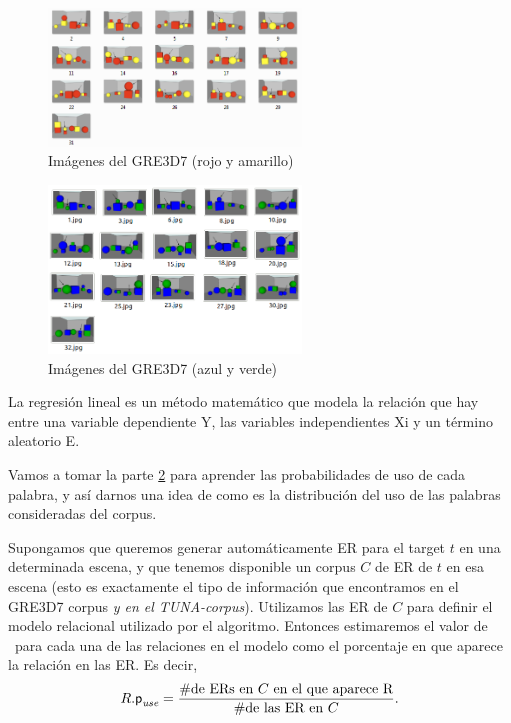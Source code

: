 \begin{figure}[ht]
\centering
\includegraphics[width=0.6\textwidth]{images/rojo-amarillo.png}
\caption{Im\'agenes del GRE3D7 (rojo y amarillo)}
\label{rojo-amarillo}
\end{figure}

\begin{figure}[ht]
\centering
\includegraphics[width=0.6\textwidth]{images/imagenesML.png}
\caption{Im\'agenes del GRE3D7 (azul y verde)}
\label{verde-azul}
\end{figure}

La regresi\'on lineal es un m\'etodo matem\'atico que modela la relaci\'on que hay entre una variable dependiente Y, las variables independientes Xi y un t\'ermino aleatorio E.  

Vamos a tomar la parte \ref{verde-azul} para aprender las probabilidades de uso de cada palabra, y as\'i darnos una idea de como es la distribuci\'on del uso de las palabras consideradas del corpus.


Supongamos que queremos generar autom\'aticamente ER para el target $t$ en una
determinada escena, y que tenemos disponible un corpus $C$ de ER de $t$
en esa escena (esto es exactamente el tipo de informaci\'on que encontramos en el
GRE3D7 corpus \textit{y en el TUNA-corpus}). Utilizamos las ER de $C$
para definir el modelo relacional utilizado por el algoritmo. Entonces 
estimaremos el valor de \puse\ para cada una de las relaciones en el modelo como el
porcentaje en que aparece la relaci\'on en las ER. Es decir,
\begin{equation} \label{eq1}
R.\textsf{p}_\textit{use} = \frac {\#\mbox{de ERs en $C$ en el que aparece R}} {\#\mbox{de las ER en $C$}}.
\end{equation}

